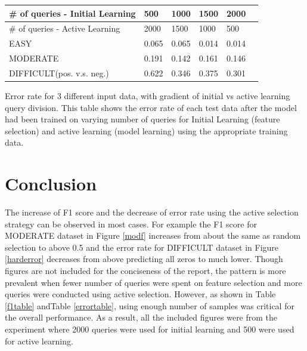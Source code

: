\documentclass[paper=a4, fontsize=11pt]{scrartcl}
\numberwithin{equation}{section}    %
\numberwithin{figure}{section}      %
\numberwithin{table}{section}       %
\numberwithin{equation}{section}    %
\numberwithin{figure}{section}      %
\numberwithin{table}{section}       %
\begin{document}
\begin{minipage}{\linewidth}
\smallskip
\centering
{} \label{errortable} 
\begin{tabular}{ p{2in} C{.85in} *4{C{.7in}}}\toprule[1.5pt]
\# of queries - Initial Learning & 500 & 1000 & 1500 & 2000  \\ \toprule[1.5pt]
\# of queries - Active Learning & 2000 & 1500 & 1000 & 500  \\ \bottomrule[1.25pt]
EASY                          & 0.065                              & 0.065                               & 0.014                               & 0.014                               \\
MODERATE                      & 0.191                              & 0.142                               & 0.161                               & 0.146                               \\
DIFFICULT(pos. v.s. neg.)     & 0.622                              & 0.346                               & 0.375                               & 0.301                               \\
\bottomrule[1.25pt]
\end{tabular} \par \bigskip 
Error rate for 3 different input data, with gradient of initial vs active learning query division.
This table shows the error rate of each test data after the model had been trained on varying number of queries for Initial Learning (feature selection) and active learning (model learning) using the appropriate training data. 
\end{minipage}
\FloatBarrier


\section{Conclusion}


The increase of F1 score and the decrease of error rate using the active selection strategy can be observed in most cases. For example the F1 score for MODERATE dataset in Figure \ref{modf} increases from about the same as random selection to above 0.5 and the error rate for DIFFICULT dataset in Figure \ref{harderror} decreases from above predicting all zeros to much lower. Though figures are not included for the conciseness of the report, the pattern is more prevalent when fewer number of queries were spent on feature selection and more queries were conducted using active selection. However, as shown in Table \ref{f1table} andTable \ref{errortable}, using enough number of samples was critical for the overall performance. As a result, all the included figures were from the experiment where 2000 queries were used for initial learning and 500 were used for active learning. 
\end{document}
